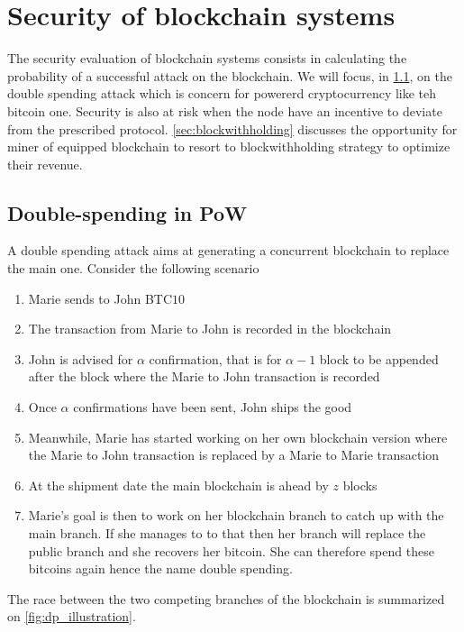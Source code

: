 \chapter{Security of blockchain systems}\label{chap:security}
The security evaluation of blockchain systems consists in calculating the probability of a successful attack on the blockchain. We will focus, in \cref{sec:double_spending}, on the double spending attack which is concern for \PoW powererd cryptocurrency like teh bitcoin one. Security is also at risk when the node have an incentive to deviate from the prescribed protocol. \cref{sec:blockwithholding} discusses the opportunity for miner of \PoW equipped blockchain to resort to blockwithholding strategy to optimize their revenue. 

\section{Double-spending in PoW}\label{sec:double_spending}
A double spending attack aims at generating a concurrent blockchain to replace the main one. Consider the following scenario
\begin{enumerate}
	\item Marie sends to John BTC$10$
	\item The transaction from Marie to John is recorded in the blockchain
	\item John is advised for $\alpha$ confirmation, that is for $\alpha-1$ block to be appended after the block where the Marie to John transaction is recorded
	\item Once $\alpha$ confirmations have been sent, John ships the good
	\item Meanwhile, Marie has started working on her own blockchain version where the Marie to John transaction is replaced by a Marie to Marie transaction
	\item At the shipment date the main blockchain is ahead by $z$ blocks 
	\item Marie's goal is then to work on her blockchain branch to catch up with the main branch. If she manages to to that then her branch will replace the public branch and she recovers her bitcoin. She can therefore spend these bitcoins again hence the name double spending.
\end{enumerate}
The race between the two competing branches of the blockchain is summarized on \cref{fig:dp_illustration}.
